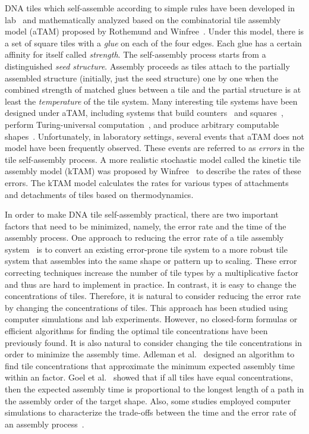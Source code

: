 \documentclass[11pt]{article}
\begin{document}
DNA tiles which self-assemble according to simple rules have been developed in lab~\cite{wlws98:stripe} and mathematically analyzed based on the combinatorial tile assembly model (aTAM) proposed by Rothemund and Winfree~\cite{rw00:square1}. Under this model, there is a set of square tiles with a {\it glue} on each of the four edges. Each glue has a certain affinity for itself called {\it strength}. The self-assembly process starts from a distinguished {\it seed structure}. Assembly proceeds as tiles attach to the partially assembled structure (initially, just the seed structure) one by one when the combined strength of matched glues between a tile and the partial structure is at least the {\it temperature} of the tile system. Many interesting tile systems have been designed under aTAM, including systems that build counters~\cite{acgh01:square,cgm04:optcounter} and squares~\cite{rw00:square1,ks06:temperture,d09:randomized}, perform Turing-universal computation~\cite{w98:phd}, and produce arbitrary computable shapes~\cite{ll99:nphard,sw07:shapes}. Unfortunately, in laboratory settings, several events that aTAM does not model have been frequently observed. These events are referred to as {\it errors} in the tile self-assembly process. A more realistic stochastic model called the kinetic tile assembly model (kTAM) was proposed by Winfree~\cite{w98:phd} to describe the rates of these errors. The kTAM model calculates the rates for various types of attachments and detachments of tiles based on thermodynamics. 

In order to make DNA tile self-assembly practical, there are two important factors that need to be minimized, namely, the error rate and the time of the assembly process. One approach to reducing the error rate of a tile assembly system~\cite{wb02:proof,cg04:snaked,rsy04:compact,scw08:healing_proofreading,clg07:criteria} is to convert an existing error-prone tile system to a more robust tile system that assembles into the same shape or pattern up to scaling. These error correcting techniques increase the number of tile types by a multiplicative factor and thus are hard to implement in practice. In contrast, it is easy to change the concentrations of tiles. Therefore, it is natural to consider reducing the error rate by changing the concentrations of tiles. This approach has been studied using computer simulations and lab experiments. However, no closed-form formulas or efficient algorithms for finding the optimal tile concentrations have been previously found. It is also natural to consider changing the tile concentrations in order to minimize the assembly time. Adleman et al.~\cite{acghkmr02:opt} designed an algorithm to find tile concentrations that approximate the minimum expected assembly time within an  factor. Goel et al.~\cite{cgm04:optcounter} showed that if all tiles have equal concentrations, then the expected assembly time is proportional to the longest length of a path in the assembly order of the target shape. Also, some studies employed computer simulations to characterize the trade-offs between the time and the error rate of an assembly process~\cite{wb02:proof,cg04:snaked}. 
\end{document}
